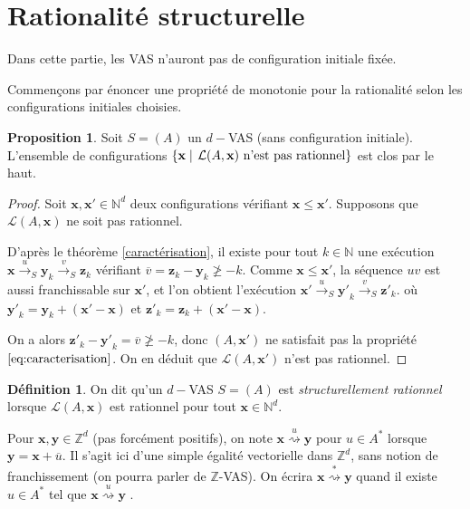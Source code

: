 \documentclass[a4paper,final]{article}
\theoremstyle{definition}
\newtheorem{Definition}[Theorem]{Définition}
\newtheorem{Proposition}[Theorem]{Proposition}
\let\leq\leqslant
\let\geq\geqslant
\newcommand{\set}[2]{\left\{#1\mathrel{\left|\vphantom{#1}\vphantom{#2}\right.}#2\right\}}
\newcommand{\N}{\ensuremath{\mathbb{N}}}
\newcommand{\Z}{\ensuremath{\mathbb{Z}}}
\newcommand{\lang}{\ensuremath{\mathcal{L}}}
\newcommand{\trans}[2]{\ensuremath{\stackrel{#1}{\longrightarrow}_{#2}}}
\newcommand{\transZ}[1]{\ensuremath{\stackrel{#1}{\rightsquigarrow}}}
\newcommand{\vect}[1]{\ensuremath{\mathbf{#1}}}
\newcommand{\valeur}[1]{\ensuremath{\overline{#1}}}
\begin{document}

\section{Rationalité structurelle}

Dans cette partie, les VAS n'auront pas de configuration initiale fixée.

Commençons par énoncer une propriété de monotonie pour la rationalité selon les configurations initiales choisies.

\begin{Proposition}\label{monotonie_rationnel}
Soit $S=(A)$ un $d-$VAS (sans configuration initiale).
L'ensemble de configurations $\set{\vect{x}}{\lang(A,\vect{x}) \text{ n'est pas rationnel}}$ est clos par le haut.
\end{Proposition}

\begin{proof}
Soit $\vect{x},\vect{x'}\in\N^d$ deux configurations vérifiant $\vect{x} \leq \vect{x'}$.
Supposons que $\lang(A,\vect{x})$ ne soit pas rationnel.

D'après le théorème \ref{caractérisation}, il existe pour tout $k\in\N$ une exécution $\vect{x} \trans{u}{S} \vect{y}_k \trans{v}{S} \vect{z}_k$ vérifiant $\valeur{v} = \vect{z}_k - \vect{y}_k \not\geq -k$.
Comme $\vect{x}\leq\vect{x'}$, la séquence $uv$ est aussi franchissable sur $\vect{x'}$, et l'on obtient l'exécution $\vect{x'} \trans{u}{S} \vect{y'}_k \trans{v}{S} \vect{z'}_k$.
où $\vect{y'}_k = \vect{y}_k + (\vect{x'} - \vect{x})$ et $\vect{z'}_k = \vect{z}_k + (\vect{x'} - \vect{x})$.

On a alors $\vect{z'}_k - \vect{y'}_k = \valeur{v} \not\geq -k$, donc $(A,\vect{x'})$ ne satisfait pas la propriété $\eqref{eq:caracterisation}$.
On en déduit que $\lang(A,\vect{x'})$ n'est pas rationnel.
\end{proof}

\begin{Definition}
On dit qu'un $d-$VAS $S = (A)$ est \emph{structurellement rationnel} lorsque $\lang(A,\vect{x})$ %
est rationnel pour tout  $\vect{x}\in\N^d$.
\end{Definition}

Pour $\vect{x},\vect{y}\in\Z^d$ (pas forcément positifs), on note $\vect{x} \transZ{u} \vect{y}$ pour $u\in A^*$ lorsque $\vect{y} = \vect{x} + \valeur{u}$.
Il s'agit ici d'une simple égalité vectorielle dans $\Z^d$, sans notion de franchissement (on pourra parler de $\Z$-VAS).
On écrira $\vect{x} \transZ{*} \vect{y}$ quand il existe $u\in A^*$ tel que $\vect{x} \transZ{u} \vect{y}$ .
\end{document}
